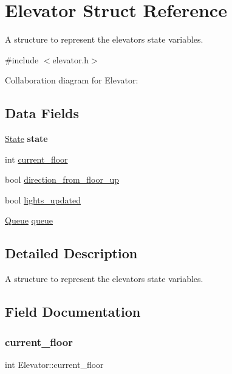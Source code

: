 \hypertarget{structElevator}{}\section{Elevator Struct Reference}
\label{structElevator}


A structure to represent the elevators state variables.  




{\ttfamily \#include $<$elevator.\+h$>$}



Collaboration diagram for Elevator\+:
\subsection*{Data Fields}
\begin{DoxyCompactItemize}
\item 
\mbox{\label{structElevator_a641d6ba2deb2c870ed0cb6250204757f}} 
\hyperlink{elevator_8h_a5d74787dedbc4e11c1ab15bf487e61f8}{State} {\bfseries state}
\item 
int \hyperlink{structElevator_aae297f56aca24d7be4518e2b14953015}{current\+\_\+floor}
\item 
bool \hyperlink{structElevator_aa27b6845cc930c06eefd0e7b6842d747}{direction\+\_\+from\+\_\+floor\+\_\+up}
\item 
bool \hyperlink{structElevator_a414af4bd61cd50f830e3c0e822b45c6b}{lights\+\_\+updated}
\item 
\hyperlink{structQueue}{Queue} \hyperlink{structElevator_af5239ff4e1b725701da4934f8c9443b2}{queue}
\end{DoxyCompactItemize}


\subsection{Detailed Description}
A structure to represent the elevators state variables. 

\subsection{Field Documentation}
\mbox{\label{structElevator_aae297f56aca24d7be4518e2b14953015}} 
\subsubsection{\texorpdfstring{current\+\_\+floor}{current\_floor}}
{\footnotesize\ttfamily int Elevator\+::current\+\_\+floor}

